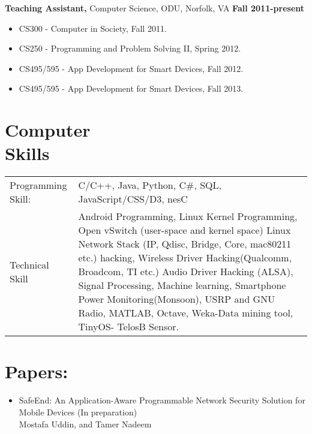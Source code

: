 \documentclass[margin]{res}
\begin{document}
\begin{resume}
{\bf Teaching Assistant,} Computer Science, ODU, Norfolk, VA \hfill \textbf{Fall  2011-present}
\begin{itemize} \itemsep -2pt %
\item  CS300 - Computer in Society, Fall 2011. 
\item  CS250 - Programming and Problem Solving II, Spring 2012.
\item CS495/595 - App Development for Smart Devices, Fall 2012.
\item CS495/595 - App Development for Smart Devices, Fall 2013.
\end{itemize}



 


\section{Computer \\ Skills}
   \begin{tabular}{l p{3in}}
    Programming Skill: & C/C++, Java, Python, C\#, SQL, JavaScript/CSS/D3, nesC \\
     Technical Skill &  Android Programming,
     					     Linux Kernel Programming, 
					     Open vSwitch (user-space and kernel space)					
					     Linux Network Stack (IP, Qdisc, Bridge, Core, mac80211 etc.) hacking,
					     Wireless Driver Hacking(Qualcomm, Broadcom, TI etc.)
					     Audio Driver Hacking (ALSA), Signal Processing, Machine learning, Smartphone Power Monitoring(Monsoon), 
					     USRP and GNU Radio, MATLAB, Octave, Weka-Data mining tool, TinyOS- TelosB Sensor.
 \end{tabular}



\section{Papers:} 
\begin{itemize} \itemsep -2pt



\item SafeEnd: An Application-Aware Programmable Network Security Solution for Mobile Devices (In preparation)\\
Mostafa Uddin, and Tamer Nadeem 


\end{itemize}
\end{resume}
\end{document}
